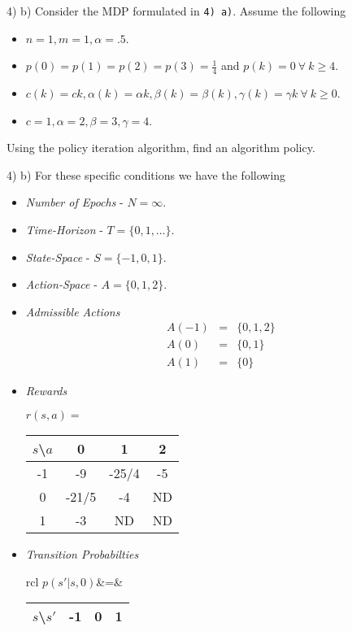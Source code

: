 \documentclass[11pt,a4paper]{article}
\begin{document}
\begin{question}{4) b)}
  Consider the MDP formulated in \texttt{4) a)}. Assume the following
  \begin{itemize}
    \item $n=1,m=1,\alpha=.5$.
    \item $p(0)=p(1)=p(2)=p(3)=\frac14$ and $p(k)=0\ \forall\ k\geq4$.
    \item $c(k)=ck,\alpha(k)=\alpha k,\beta(k)=\beta(k),\gamma(k)=\gamma k\ \forall\ k\geq 0$.
    \item $c=1,\alpha=2,\beta=3,\gamma=4$.
  \end{itemize}
  Using the policy iteration algorithm, find an algorithm policy.
\end{question}

\begin{answer}{4) b)}
  For these specific conditions we have the following
  \begin{itemize}
    \item \textit{Number of Epochs} - $N=\infty$.
    \item \textit{Time-Horizon} - $T=\{0,1,\dots\}$.
    \item \textit{State-Space} - $S=\{-1,0,1\}$.
    \item \textit{Action-Space} - $A=\{0,1,2\}$.
    \item \textit{Admissible Actions}
    \[\begin{array}{rcl}
      A(-1)&=&\{0,1,2\}\\
      A(0)&=&\{0,1\}\\
      A(1)&=&\{0\}
    \end{array}\]
    \item \textit{Rewards}
    \begin{center}$r(s,a)=$
      \begin{tabular}{c|ccc}
        $s$\textbackslash$a$&0&1&2\\\hline
        -1&-9&-25/4&-5\\
        0&-21/5&-4&ND\\
        1&-3&ND&ND
      \end{tabular}
    \end{center}
    \item \textit{Transition Probabilties}
    \begin{center}
      \begin{tabular}{rcl}
        $p(s'|s,0)$&=&
        \begin{tabular}{c|ccc}
          $s$\textbackslash$s'$&-1&0&1\\\hline

\end{tabular}
\end{tabular}
\end{center}
\end{itemize}
\end{answer}
\end{document}
